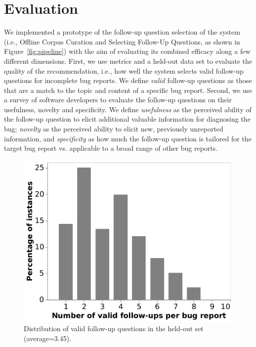 \section{Evaluation}

We implemented a prototype of the follow-up question selection of the \evpi system (i.e., Offline Corpus Curation and Selecting Follow-Up Questions, as shown in Figure~\ref{fig:pipeline}) with the aim of evaluating its combined efficacy along
a few different dimensions. First, we use metrics and a held-out data set to evaluate the quality
of the recommendation, i.e., how well the system selects valid follow-up questions for incomplete bug reports. We define {\em valid} follow-up questions as those that are a match to the topic and content of a specific bug report.
Second, we use a survey of software developers to evaluate the follow-up questions on their usefulness, novelty and specificity. We define {\em usefulness} as the perceived ability of the follow-up question to elicit additional valuable information for diagnosing the bug; {\em novelty} as the perceived ability to elicit new, previously unreported information, and {\em specificity} as how much the follow-up question is tailored for the target bug report vs. applicable to a broad range of other bug reports.

\begin{figure}
	\centering
	\includegraphics[width=0.7\linewidth]{figures/viz_annotation.pdf}
	\caption{Distribution of valid follow-up questions in the held-out set (average=3.45).}
	\label{fig:annotation}
\end{figure}

\newcommand*{\tab}{\hspace*{0.5cm}}%

